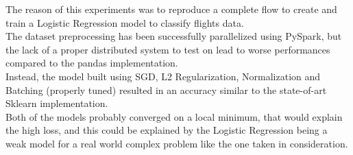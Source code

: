 \documentclass[
	letterpaper, %
	10pt, %
]{class}
\begin{document}
The reason of this experiments was to reproduce a complete flow to create and train a Logistic Regression model to classify flights data.\\
The dataset preprocessing has been successfully parallelized using PySpark, but the lack of a proper distributed system to test on lead to worse performances compared to the pandas implementation.\\
Instead, the model built using SGD, L2 Regularization, Normalization and Batching (properly tuned) resulted in an accuracy similar to the state-of-art Sklearn implementation.\\
Both of the models probably converged on a local minimum, that would explain the high loss, and this could be explained by the Logistic Regression being a weak model for a real world complex problem like the one taken in consideration.


\printbibliography %


\end{document}
